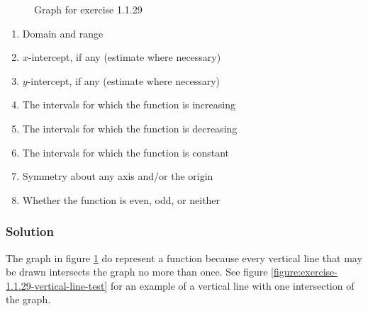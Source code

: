 \documentclass[11pt, letterpaper, oneside]{memoir}
\begin{document}
\begin{figure}[H]
  \centering
  \caption{Graph for exercise 1.1.29}
  \label{figure:exercise-1.1.29}
\end{figure}

\begin{enumerate}[label=(\alph*)]
  \item Domain and range
  \item $ x $-intercept, if any (estimate where necessary)
  \item $ y $-intercept, if any (estimate where necessary)
  \item The intervals for which the function is increasing
  \item The intervals for which the function is decreasing
  \item The intervals for which the function is constant
  \item Symmetry about any axis and/or the origin
  \item Whether the function is even, odd, or neither
\end{enumerate}

\subsubsection{Solution}

The graph in figure \ref{figure:exercise-1.1.29} do represent a function because every vertical line that may be drawn intersects the graph no more than once. See figure \ref{figure:exercise-1.1.29-vertical-line-test} for an example of a vertical line with one intersection of the graph.
\end{document}
